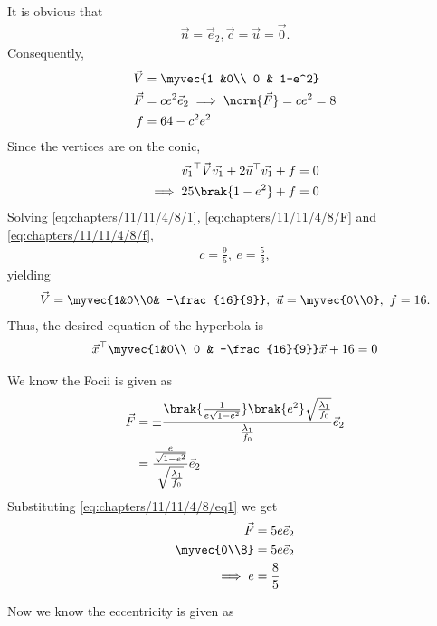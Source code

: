 It is obvious that
	\begin{align}
		\vec{n} 
			= \vec{e}_2,
	\vec{c} =\vec{u}=\vec{0}.
\end{align}
Consequently,
%
\begin{align}
	\vec{V} &= \myvec{1 &0\\ 0 & 1-e^2}
	\\
	\vec{F} &= ce^2\vec{e}_2 \implies \norm{\vec{F}} = ce^2=8
\label{eq:chapters/11/11/4/8/F}
	\\
	f 
	  &= 64 - c^2 e^2
\label{eq:chapters/11/11/4/8/f}
\end{align}
%
Since the vertices are  on the conic,
\begin{align}
	\vec{v_1}^{\top}\vec{V}\vec{v_1} +2\vec{u}^{\top}\vec{v_1}+f &= 0\\
\implies 25\brak{1-e^2} + f &= 0\\
	 \label{eq:chapters/11/11/4/8/1}
\end{align}
Solving \eqref{eq:chapters/11/11/4/8/1},
\eqref{eq:chapters/11/11/4/8/F}
and
\eqref{eq:chapters/11/11/4/8/f},
\begin{align}
	c = \frac{9}{5},\ 
	e = \frac{5}{3},
\end{align}
%
yielding
\begin{align}
	\vec{V} = \myvec{1&0\\0& -\frac{16}{9}} ,\
	\vec{u} = \myvec{0\\0},\
	f = 16.
\end{align}
%
Thus, the desired equation of the hyperbola is
\begin{align}
	\vec{x}^{\top} \myvec{1&0\\ 0 & -\frac{16}{9}} \vec{x} +16 =0
\end{align}
%
\item We know the Focii is given as
\begin{align}
	\vec{F} &= \pm \frac{\brak{\frac{1}{e\sqrt{1-e^2}}}\brak{e^2}\sqrt{\frac{\lambda_1}{f_0}}}{\frac{\lambda_1}{f_0}}\vec{e}_2\\
	        &= \frac{\frac{e}{\sqrt{1-e^2}}}{\sqrt{\frac{\lambda_1}{f_0}}}\vec{e}_2
\end{align}
Substituting \eqref{eq:chapters/11/11/4/8/eq1} we get
\begin{align}
	\vec{F} &= 5e\vec{e}_2\\
	\myvec{0\\8} &= 5e\vec{e}_2\\
	\implies e &= \frac{8}{5}
\end{align}
\item Now we know the eccentricity is given as

